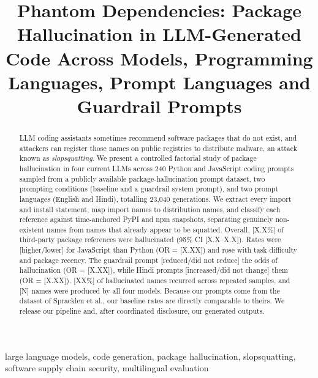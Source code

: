 \documentclass[conference]{IEEEtran}
\begin{document}
\title{Phantom Dependencies: Package Hallucination in LLM-Generated Code Across Models, Programming Languages, Prompt Languages and Guardrail Prompts}

\author{
\and
{}
\and
{}
\and
{}
}

\maketitle

\begin{abstract}
LLM coding assistants sometimes recommend software packages that do not exist, and attackers can register those names on public registries to distribute malware, an attack known as \emph{slopsquatting}. We present a controlled factorial study of package hallucination in four current LLMs across 240 Python and JavaScript coding prompts sampled from a publicly available package-hallucination prompt dataset, two prompting conditions (baseline and a guardrail system prompt), and two prompt languages (English and Hindi), totalling 23,040 generations. We extract every import and install statement, map import names to distribution names, and classify each reference against time-anchored PyPI and npm snapshots, separating genuinely non-existent names from names that already appear to be squatted. Overall, [X.X\%] of third-party package references were hallucinated (95\% CI [X.X--X.X]). Rates were [higher/lower] for JavaScript than Python (OR = [X.XX]) and rose with task difficulty and package recency. The guardrail prompt [reduced/did not reduce] the odds of hallucination (OR = [X.XX]), while Hindi prompts [increased/did not change] them (OR = [X.XX]). [XX\%] of hallucinated names recurred across repeated samples, and [N] names were produced by all four models. Because our prompts come from the dataset of Spracklen et al., our baseline rates are directly comparable to theirs. We release our pipeline and, after coordinated disclosure, our generated outputs.
\end{abstract}

\begin{IEEEkeywords}
large language models, code generation, package hallucination, slopsquatting, software supply chain security, multilingual evaluation
\end{IEEEkeywords}
\end{document}
